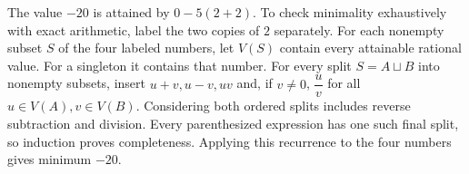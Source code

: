 The value $-20$ is attained by $0-5(2+2)$. To check minimality exhaustively with exact arithmetic, label the two copies of $2$ separately. For each nonempty subset $S$ of the four labeled numbers, let $V(S)$ contain every attainable rational value. For a singleton it contains that number. For every split $S=A\sqcup B$ into nonempty subsets, insert $u+v,u-v,uv$ and, if $v\ne0$, $\dfrac{u}{v}$ for all $u\in V(A),v\in V(B)$. Considering both ordered splits includes reverse subtraction and division. Every parenthesized expression has one such final split, so induction proves completeness. Applying this recurrence to the four numbers gives minimum $\boxed{-20}$.
